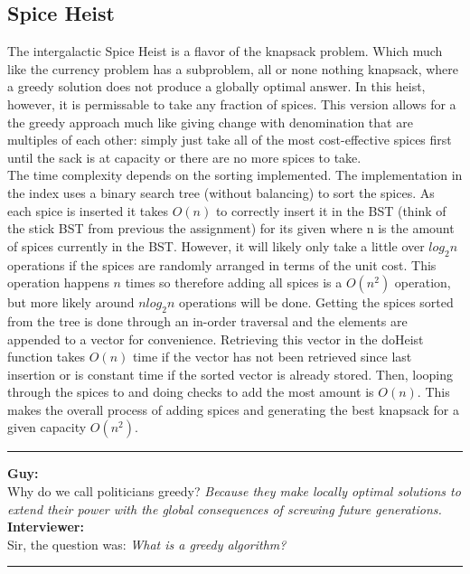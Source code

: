 \documentclass[letterpaper, 10pt]{article}
\begin{document}
\subsection{Spice Heist}
The intergalactic Spice Heist is a flavor of the knapsack problem. Which much like the currency 
problem has a subproblem, all or none nothing knapsack, where a greedy solution does not produce 
a globally optimal answer. In this heist, however, it is permissable to take any fraction
of spices. This version allows for a the greedy approach much like giving change with denomination that
are multiples of each other: simply just take all of the most cost-effective spices first until the sack
is at capacity or there are no more spices to take. \\
\newline
The time complexity depends on the sorting implemented.
The implementation in the index uses a binary search tree (without balancing) to sort the spices. As each spice
is inserted it takes \(O(n)\) to correctly insert it in the BST (think of the stick BST from previous the assignment) 
for its given where n is the amount of spices
currently in the BST. However, it will likely only take a little over \(log_2n\) operations if the spices are randomly
arranged in terms of the unit cost. This operation happens \(n\) times so therefore adding all spices is a \(O(n^2)\)
operation, but more likely around \(nlog_2n\) operations will be done. Getting the spices sorted from the tree is
done through an in-order traversal and the elements are appended to a vector for convenience. Retrieving this vector
in the doHeist function takes \(O(n)\) time if the vector has not been retrieved since last insertion or is constant time if
the sorted vector is already stored. Then, looping through the spices to and doing checks to add the most amount is \(O(n)\).
This makes the overall process of adding spices and generating the best knapsack for a given capacity \(O(n^2)\).
  
\vspace{.25cm}
\hrule
\vspace{.25cm}
\noindent
\textbf{Guy:}\\
Why do we call politicians greedy? \textit{Because they make locally optimal solutions to extend their power with the global consequences of screwing future generations.}\\
\textbf{Interviewer:}\\
Sir, the question was: \textit{What is a greedy algorithm?}
\hrule
\newpage
\end{document}
